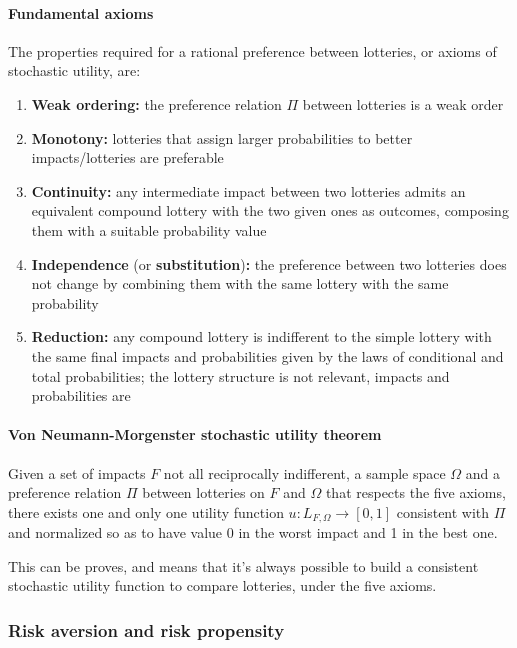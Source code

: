 \paragraph{Fundamental axioms} The properties required for a rational preference between lotteries, or axioms of stochastic utility, are: 
\begin{enumerate}
	\item \textbf{Weak ordering:} the preference relation $\Pi$ between lotteries is a weak order 
	
	\item \textbf{Monotony:} lotteries that assign larger probabilities to better impacts/lotteries are preferable
	
	\item \textbf{Continuity:} any intermediate impact between two lotteries admits an equivalent compound lottery with the two given ones as outcomes, composing them with a suitable probability value
	
	\item \textbf{Independence} (or \textbf{substitution})\textbf{:} the preference between two lotteries does not change by combining them with the same lottery with the same probability
	
	\item \textbf{Reduction:} any compound lottery is indifferent to the simple lottery with the same final impacts and probabilities given by the laws of conditional and total probabilities; the lottery structure is not relevant, impacts and probabilities are
\end{enumerate}

\paragraph{Von Neumann-Morgenster stochastic utility theorem} Given a set of impacts $F$ not all reciprocally indifferent, a sample space $\Omega$ and a preference relation $\Pi$ between lotteries on $F$ and $\Omega$ that respects the five axioms, there exists one and only one utility function $u: L_{F, \Omega} \rightarrow [0,1]$ consistent with $\Pi$ and normalized so as to have value 0 in the worst impact and 1 in the best one.

This can be proves, and means that it's always possible to build a consistent stochastic utility function to compare lotteries, under the five axioms. 

\subsubsection{Risk aversion and risk propensity}

